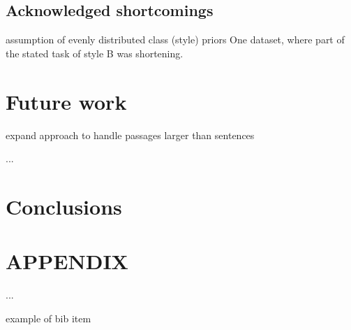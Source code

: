 \documentclass[letterpaper, 10 pt, conference]{ieeeconf}  %
\begin{document}
  \subsection{Acknowledged shortcomings}
  assumption of evenly distributed class (style) priors
One dataset, where part of the stated task of style B was shortening.

\section{Future work}
expand approach to handle passages larger than sentences

...
\section{Conclusions}



\addtolength{\textheight}{-12cm}   %







\section*{APPENDIX}

...



\begin{thebibliography}{99}

 example of bib item 

\end{thebibliography}
\end{document}
